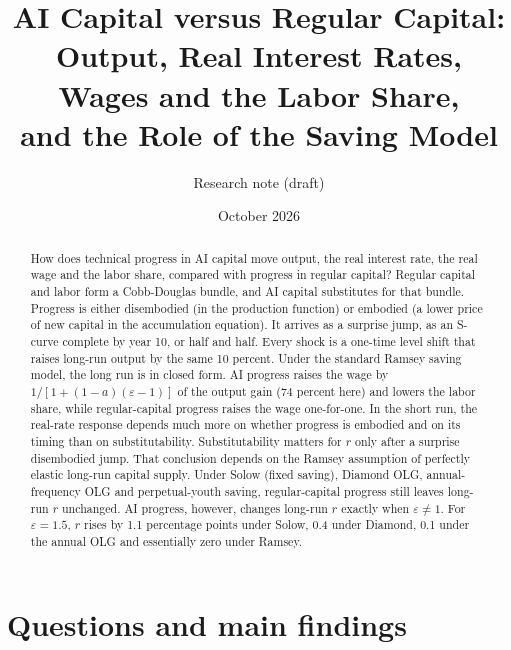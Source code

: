 \documentclass[11pt]{article}
\title{AI Capital versus Regular Capital:\\
Output, Real Interest Rates, Wages and the Labor Share,\\ and the Role of the Saving Model}
\author{Research note (draft)}
\date{October 2026}
\newcommand{\e}{\varepsilon}
\begin{document}
\maketitle

\begin{abstract}
\noindent How does technical progress in AI capital move output, the real interest rate,
the real wage and the labor share, compared with progress in regular capital? Regular capital
and labor form a Cobb-Douglas bundle, and AI capital substitutes for that bundle.
Progress is either disembodied (in the production function) or embodied (a lower price
of new capital in the accumulation equation). It arrives as a surprise jump, as an
S-curve complete by year 10, or half and half. Every shock is a one-time level shift
that raises long-run output by the same 10 percent. Under the standard Ramsey saving
model, the long run is in closed form. AI progress raises the wage by
$1/[1+(1-a)(\e-1)]$ of the output gain (74 percent here) and lowers the labor share,
while regular-capital progress raises the wage one-for-one. In the short run, the
real-rate response depends much more on whether progress is embodied and on its timing than on
substitutability. Substitutability matters for $r$ only after a surprise
disembodied jump. That conclusion depends on the Ramsey assumption of perfectly
elastic long-run capital supply. Under Solow (fixed saving), Diamond OLG,
annual-frequency OLG and perpetual-youth saving, regular-capital progress still leaves
long-run $r$ unchanged. AI progress, however, changes long-run $r$ exactly when
$\e\neq1$. For $\e=1.5$, $r$ rises by 1.1 percentage points under Solow, 0.4 under Diamond, 0.1 under
the annual OLG and essentially zero under Ramsey.
\end{abstract}

\section{Questions and main findings}
\end{document}
